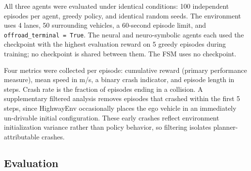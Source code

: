 \documentclass[11pt,a4paper]{article}
\begin{document}
All three agents were evaluated under identical conditions: 100 independent episodes per agent, greedy policy, and identical random seeds. The environment uses 4 lanes, 50 surrounding vehicles, a 60-second episode limit, and \texttt{offroad\_terminal = True}. The neural and neuro-symbolic agents each used the checkpoint with the highest evaluation reward on 5 greedy episodes during training; no checkpoint is shared between them. The FSM uses no checkpoint.

Four metrics were collected per episode: cumulative reward (primary performance measure), mean speed in m/s, a binary crash indicator, and episode length in steps. Crash rate is the fraction of episodes ending in a collision. A supplementary filtered analysis removes episodes that crashed within the first 5 steps, since HighwayEnv occasionally places the ego vehicle in an immediately un-drivable initial configuration. These early crashes reflect environment initialization variance rather than policy behavior, so filtering isolates planner-attributable crashes.

\subsection{Evaluation}

\begin{table}[h]
  \centering
  \caption{Evaluation results over all 100 episodes.}
  \label{tab:all}
\end{table}
\end{document}

